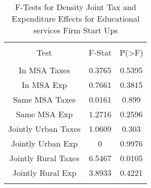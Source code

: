 
\begin{table}[!htbp] \centering 
  \caption{F-Tests for Density Joint Tax and Expenditure Effects for Educational services Firm Start Ups} 
  \label{61Ftests} 
\begin{tabular}{@{\extracolsep{5pt}} ccc} 
\\[-1.8ex]\hline 
\hline \\[-1.8ex] 
Test & F-Stat & P(\textgreater F) \\ 
\hline \\[-1.8ex] 
In MSA Taxes & 0.3765 & 0.5395 \\ 
In MSA Exp & 0.7661 & 0.3815 \\ 
Same MSA Taxes & 0.0161 & 0.899 \\ 
Same MSA Exp & 1.2716 & 0.2596 \\ 
Jointly Urban Taxes & 1.0609 & 0.303 \\ 
Jointly Urban Exp & 0 & 0.9976 \\ 
Jointly Rural Taxes & 6.5467 & 0.0105 \\ 
Jointly Rural Exp & 3.8933 & 0.4221 \\ 
\hline \\[-1.8ex] 
\end{tabular} 
\end{table} 
